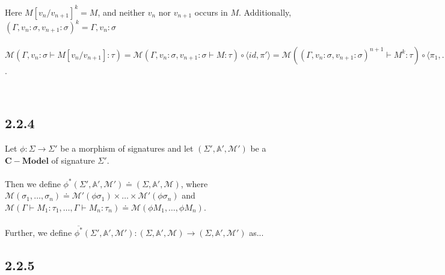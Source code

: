 \documentclass{article}
\newcommand{\mbf}{\mathbf}
\begin{document}
\begin{description}
\begin{description}
Here $M[v_n/v_{n+1}]^k = M$, and neither $v_n$ nor $v_{n+1}$ occurs in $M$.
Additionally, $(\Gamma,v_n:\sigma,v_{n+1}:\sigma)^k = \Gamma,v_n:\sigma$\\~\\
$\mathcal M(\Gamma,v_n : \sigma \vdash M[v_n/v_{n+1}] : \tau) = \mathcal M(\Gamma,v_n : \sigma,v_{n+1} : \sigma \vdash M : \tau)
 \circ \langle id, \pi' \rangle = \mathcal M((\Gamma,v_n:\sigma,v_{n+1}:\sigma)^{n+1} \vdash M^k : \tau) \circ \langle \pi_1, \ldots, \pi_{n-1},\pi_{n+1} \rangle \circ \langle id, \pi' \rangle = \mathcal M(\Gamma,v_n : \sigma \vdash M : \tau) \circ 
\langle \pi_1, \ldots, \pi_{n-1},\pi_{n+1} \rangle \circ \langle id, \pi' \rangle = \mathcal M(\Gamma,v_n : \sigma \vdash M : \tau)
\circ a$.



\item[Case $k < n$:]~\\


\end{description}

\end{description}




\subsection*{2.2.4}

Let $\phi : \Sigma \to \Sigma'$ be a morphism of signatures and let $(\Sigma', \mathbb A', \mathcal M')$
be a $\mbf{C-Model}$ of signature $\Sigma'$.\\~\\

Then we define 
$\phi^*(\Sigma', \mathbb A', \mathcal M') \doteq (\Sigma, \mathbb A', \mathcal M)$, 
where $\mathcal M(\sigma_1, \ldots, \sigma_n) \doteq \mathcal M'(\phi \sigma_1) \times \ldots \times \mathcal M'(\phi \sigma_n) 
$ and $\mathcal M(\Gamma \vdash M_1 : \tau_1, \ldots, \Gamma \vdash M_n : \tau_n) \doteq 
\mathcal M(\phi M_1, \ldots, \phi M_n)$.\\~\\
Further, we define $\overline{\phi^*}(\Sigma', \mathbb A', \mathcal M') : (\Sigma,\mathbb A', \mathcal M) \to (\Sigma, \mathbb A', \mathcal M')$ as... 



\subsection*{2.2.5}
\end{document}
